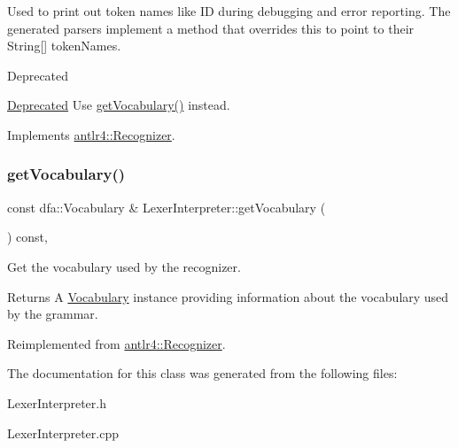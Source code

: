 Used to print out token names like ID during debugging and error reporting. The generated parsers implement a method that overrides this to point to their String\mbox{[}\mbox{]} token\+Names.

\begin{DoxyRefDesc}{Deprecated}
\item[\hyperlink{deprecated__deprecated000010}{Deprecated}]Use \hyperlink{classantlr4_1_1LexerInterpreter_addd24350f968e05ba45f2c8490b16e9e}{get\+Vocabulary()} instead. \end{DoxyRefDesc}


Implements \hyperlink{classantlr4_1_1Recognizer_aef9436cfc73e828229b90a57c8ff2493}{antlr4\+::\+Recognizer}.

\mbox{\label{classantlr4_1_1LexerInterpreter_addd24350f968e05ba45f2c8490b16e9e}} 
\subsubsection{\texorpdfstring{get\+Vocabulary()}{getVocabulary()}}
{\footnotesize\ttfamily const dfa\+::\+Vocabulary \& Lexer\+Interpreter\+::get\+Vocabulary (\begin{DoxyParamCaption}{ }\end{DoxyParamCaption}) const\hspace{0.3cm}{\ttfamily [override]}, {\ttfamily [virtual]}}

Get the vocabulary used by the recognizer.

\begin{DoxyReturn}{Returns}
A \hyperlink{}{Vocabulary} instance providing information about the vocabulary used by the grammar. 
\end{DoxyReturn}


Reimplemented from \hyperlink{classantlr4_1_1Recognizer_aae7ec953d3f35749e62ccb96fa3e0946}{antlr4\+::\+Recognizer}.



The documentation for this class was generated from the following files\+:\begin{DoxyCompactItemize}
\item 
Lexer\+Interpreter.\+h\item 
Lexer\+Interpreter.\+cpp\end{DoxyCompactItemize}
